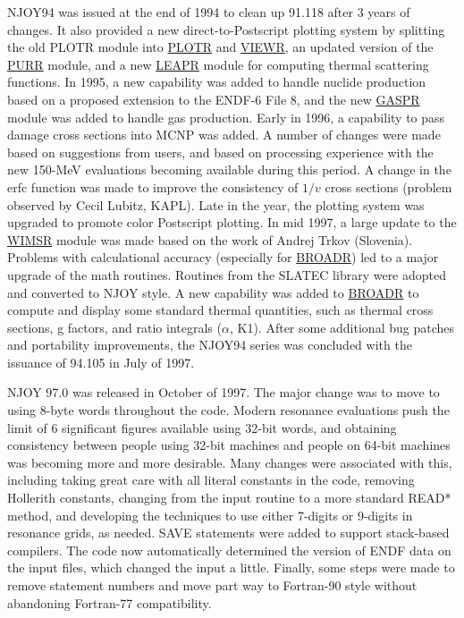 NJOY94 was issued at the end of 1994 to clean up
91.118 after 3 years of changes.  It also provided a new
direct-to-Postscript plotting system
by splitting the old PLOTR module into
\hyperlink{sPLOTRhy}{PLOTR} and
\hyperlink{sVIEWRhy}{VIEWR}, an updated
version of the \hyperlink{sPURRhy}{PURR}
module, and a new \hyperlink{sLEAPRhy}{LEAPR}
module for computing thermal
scattering functions.  In 1995, a new capability was added to
handle nuclide production based on a proposed extension
to the ENDF-6 File 8, and the new \hyperlink{sGASPRhy}{GASPR}
 module was added to handle gas production.  Early
in 1996, a capability to
pass damage cross sections into MCNP was added.
A number of changes were made based on suggestions from users,
and based on processing experience with the new 150-MeV evaluations
becoming available during this period.  A change in the erfc
function was made to improve the consistency of $1/v$ cross
sections (problem observed by Cecil Lubitz, KAPL).
Late in the year, the plotting system was upgraded to promote
color Postscript plotting.  In mid 1997, a large update to the
\hyperlink{sWIMSRhy}{WIMSR} module was
made based on the work of Andrej Trkov
(Slovenia).  Problems with calculational accuracy (especially for
\hyperlink{sBROADRhy}{BROADR}) led to a major upgrade of the
math routines.  Routines from the SLATEC library were adopted
and converted to NJOY style. A new capability was added to
\hyperlink{sBROADRhy}{BROADR}
to compute and display some standard thermal quantities, such
as thermal cross sections, g factors, and ratio integrals ($\alpha$, K1).
 After some additional bug patches and portability improvements,
the NJOY94 series was concluded with the issuance
of 94.105 in July of 1997.

NJOY 97.0 was released in October of 1997.  The
major change was to move to using 8-byte words throughout the code.
Modern resonance evaluations push the limit of 6 significant figures
available using 32-bit words, and obtaining consistency between people
using 32-bit machines and people on 64-bit machines was becoming more
and more desirable.  Many changes were associated with this,
including taking great care with all literal constants in the
code, removing Hollerith constants, changing from the 
input routine to a more standard READ* method, and developing
the techniques to use either 7-digits or 9-digits in resonance
grids, as needed.  SAVE statements were added to support stack-based
compilers.  The code now automatically determined the version of
ENDF data on the input files, which changed the input a little.
Finally, some steps were made to remove statement numbers and move
part way to Fortran-90 style without abandoning Fortran-77
compatibility.

